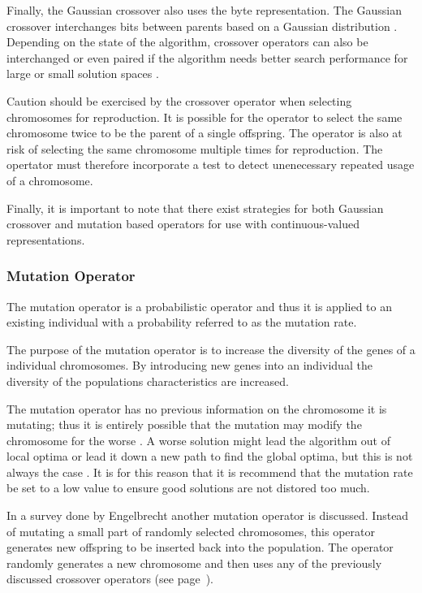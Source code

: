 Finally, the Gaussian crossover also uses the byte representation. The Gaussian crossover interchanges bits between parents based on a Gaussian distribution \cite{ParallelGASA,GeostatisticalGA}. Depending on the state of the algorithm, crossover operators can also be interchanged or even paired if the algorithm needs better search performance for large or small solution spaces \cite{HetergeneousGA,ParallelGASA}.

Caution should be exercised by the crossover operator when selecting chromosomes for reproduction. It is possible for the operator to select the same chromosome twice to be the parent of a single offspring\cite{CompuIntelligenceIntro}. The operator is also at risk of selecting the same chromosome multiple times for reproduction\cite{CompuIntelligenceIntro}. The opertator must therefore incorporate a test to detect unenecessary repeated usage of a chromosome\cite{CompuIntelligenceIntro}.

Finally, it is important to note that there exist strategies for both Gaussian crossover and mutation based operators for use with continuous-valued representations\cite{FundamentalSwarm}.

\subsubsection{Mutation Operator}
The mutation operator is a probabilistic operator and thus it is applied to an existing individual with a probability referred to as the mutation rate\cite{CompuIntelligenceIntro}. 

The purpose of the mutation operator is to increase the diversity of the genes of a individual chromosomes\cite{CompuIntelligenceIntro}. By introducing new genes into an individual the diversity of the populations characteristics are increased\cite{CoactiveFuzzyGA,AcceleratingGA,ConstrainedGA}.

The mutation operator has no previous information on the chromosome it is mutating; thus it is entirely possible that the mutation may modify the chromosome for the worse \cite{AcceleratingGA}. A worse solution might lead the algorithm out of local optima or lead it down a new path to find the global optima, but this is not always the case \cite{AdaptiveSAGA,FamilyGA,ConstrainedGA}. It is for this reason that it is recommend that the mutation rate be set to a low value to ensure good solutions are not distored too much\cite{CompuIntelligenceIntro}.

In a survey done by Engelbrecht\cite{CompuIntelligenceIntro} another mutation operator is discussed. Instead of mutating a small part of randomly selected chromosomes, this operator generates new offspring to be inserted back into the population. The operator randomly generates a new chromosome and then uses any of the previously discussed crossover operators (see page~\pageref{sec:crossover}).

